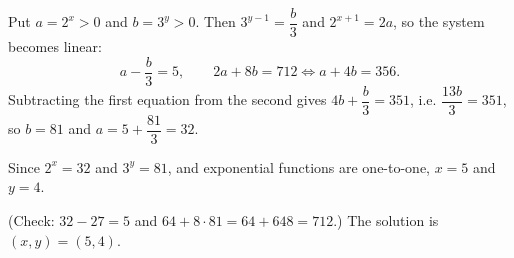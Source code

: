 Put $a=2^x>0$ and $b=3^y>0$. Then $3^{y-1}=\dfrac b3$ and $2^{x+1}=2a$, so the system becomes linear:
\[a-\dfrac b3=5,\qquad 2a+8b=712\iff a+4b=356.\]
Subtracting the first equation from the second gives $4b+\dfrac b3=351$, i.e. $\dfrac{13b}{3}=351$, so $b=81$ and $a=5+\dfrac{81}{3}=32$.

Since $2^x=32$ and $3^y=81$, and exponential functions are one-to-one, $x=5$ and $y=4$.

(Check: $32-27=5$ and $64+8\cdot81=64+648=712$.) The solution is $\boxed{(x,y)=(5,4)}$.
